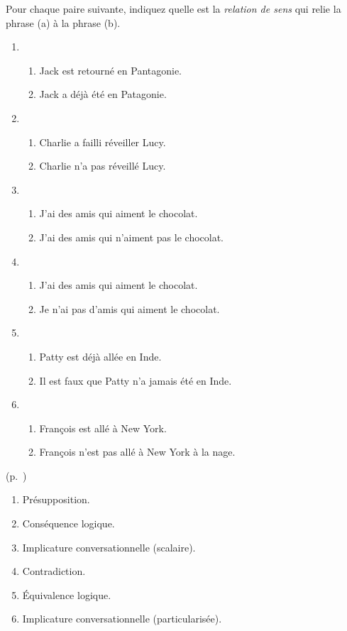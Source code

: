 \begin{exo}\label{exo:1RelSem}
Pour chaque paire suivante, indiquez quelle est la \emph{relation de sens}
qui relie la phrase (a) à la phrase (b).

\begin{enumerate}
\item\begin{enumerate}
\item Jack est retourné en Pantagonie.
\item Jack a  déjà été en Patagonie.
\end{enumerate}

\item\begin{enumerate}
\item Charlie a failli réveiller Lucy. 
\item Charlie n'a pas  réveillé Lucy. 
\end{enumerate}

\item\begin{enumerate}
\item J'ai des amis qui aiment le chocolat.
\item J'ai des amis qui n'aiment pas le chocolat.
\end{enumerate}

\item\begin{enumerate}
\item J'ai des amis qui aiment le chocolat.
\item Je n'ai pas d'amis qui aiment le chocolat.
\end{enumerate}

\item\begin{enumerate}
\item Patty est déjà allée en Inde.
\item Il est faux que Patty n'a jamais été en Inde.
\end{enumerate}

\item\begin{enumerate}
\item François est allé à New York.
\item François n'est pas allé à New York à la nage.
\end{enumerate}
\end{enumerate}

\begin{solu}
(p.~\pageref{exo:1RelSem})

\begin{enumerate}
\item Présupposition.
\item Conséquence logique.
\item Implicature conversationnelle (scalaire).
\item Contradiction.
\item Équivalence logique.
\item Implicature conversationnelle (particularisée).
\end{enumerate}
\end{solu}
\end{exo}
